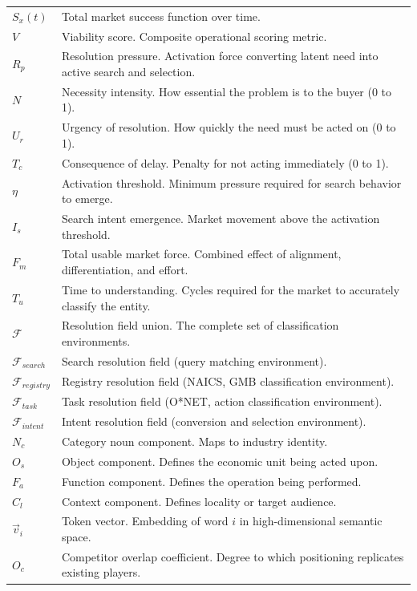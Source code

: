 \documentclass[12pt, openany]{book}
\theoremstyle{thmstyle}
\theoremstyle{defstyle}
\begin{document}
\begin{longtable}[l]{@{}p{1.4in} p{4.6in}@{}}
$S_x(t)$ & Total market success function over time. \\[4pt]
$V$ & Viability score. Composite operational scoring metric. \\[4pt]
$R_p$ & Resolution pressure. Activation force converting latent need into active search and selection. \\[4pt]
$N$ & Necessity intensity. How essential the problem is to the buyer (0 to 1). \\[4pt]
$U_r$ & Urgency of resolution. How quickly the need must be acted on (0 to 1). \\[4pt]
$T_c$ & Consequence of delay. Penalty for not acting immediately (0 to 1). \\[4pt]
$\eta$ & Activation threshold. Minimum pressure required for search behavior to emerge. \\[4pt]
$I_s$ & Search intent emergence. Market movement above the activation threshold. \\[4pt]
$F_m$ & Total usable market force. Combined effect of alignment, differentiation, and effort. \\[4pt]
$T_u$ & Time to understanding. Cycles required for the market to accurately classify the entity. \\[4pt]
$\mathcal{F}$ & Resolution field union. The complete set of classification environments. \\[4pt]
$\mathcal{F}_{search}$ & Search resolution field (query matching environment). \\[4pt]
$\mathcal{F}_{registry}$ & Registry resolution field (NAICS, GMB classification environment). \\[4pt]
$\mathcal{F}_{task}$ & Task resolution field (O*NET, action classification environment). \\[4pt]
$\mathcal{F}_{intent}$ & Intent resolution field (conversion and selection environment). \\[4pt]
$N_c$ & Category noun component. Maps to industry identity. \\[4pt]
$O_s$ & Object component. Defines the economic unit being acted upon. \\[4pt]
$F_a$ & Function component. Defines the operation being performed. \\[4pt]
$C_l$ & Context component. Defines locality or target audience. \\[4pt]
$\vec{v}_i$ & Token vector. Embedding of word $i$ in high-dimensional semantic space. \\[4pt]
$O_c$ & Competitor overlap coefficient. Degree to which positioning replicates existing players. \\[4pt]

\end{longtable}
\end{document}

